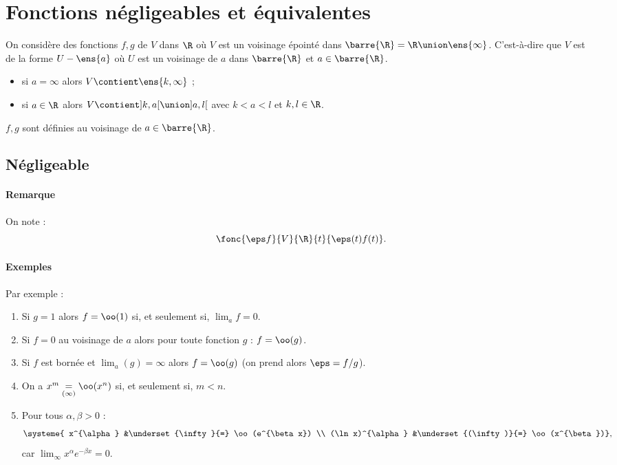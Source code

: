 \documentclass{mybourbaki}
\newcommand{\iR}{\barre{\R}}
\begin{document}
\section{Fonctions négligeables et équivalentes}

On considère des fonctions $f,g$ de $V$ dans $\R$ où $V$ est un voisinage épointé dans $\barre{\R} = \R \union \ens{\infty}$. C'est-à-dire que $V$ est de la forme $U - \ens{a}$ où $U$ est un voisinage de $a$ dans $\barre{\R}$ et $a\in \iR$.
\begin{itemize}
\item si $a = \infty$ alors $V \contient \ens{k,\infty}$ ;
\item si $a\in \R$ alors $V \contient ]k,a[ \union ]a,l[$ avec $k < a < l$ et $k,l\in \R$.
\end{itemize}

$f,g$ sont définies au voisinage de $a\in \iR$.

\subsection{Négligeable}

\paragraph{Remarque}On note :\[\fonc{\eps f}{V}{\R}{t}{\eps(t)f(t)}. \]
\paragraph{Exemples}Par exemple :
\begin{enumerate}
\item Si $g=1$ alors $f = \oo(1)$ si, et seulement si, $\lim_a f =0$.
\item Si $f=0$ au voisinage de $a$ alors pour toute fonction $g$ : $f = \oo(g)$.
\item Si $f$ est bornée et $\lim_a(g) = \infty$ alors $f = \oo(g)$ (on prend alors $\eps = f/g$).
\item On a $x^m \underset{(\infty)}{=}\oo(x^n)$ si, et seulement si, $m < n$.
\item Pour tous $\alpha,\beta >0$ : \[\systeme{ x^{\alpha} &\underset{\infty}{=} \oo(e^{\beta x}) \\ (\ln x)^{\alpha} &\underset{(\infty)}{=} \oo(x^{\beta})},\]car $\lim_\infty x^{\alpha}e^{-\beta x} = 0$.
\end{enumerate}
\end{document}
